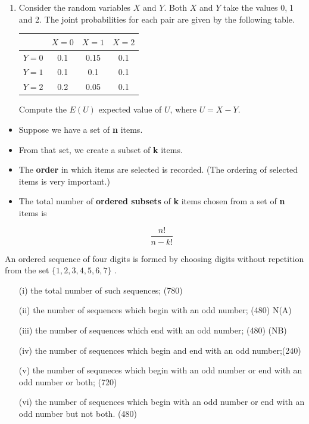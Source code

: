 \documentclass[12pt]{report}
\begin{document}
\begin{enumerate}
	
	\item Consider the random variables $X$ and $Y$. Both $X$ and $Y$ take the values 0,$\;$1 and 2. 
	The joint probabilities for each pair are given by the following table.
	\begin{center}
		\begin{tabular}{|c|c|c|c|}
			\hline  & $X=0$ & $X=1$ & $X=2$ \\ 
			\hline $Y=0$ & 0.1 & 0.15 & 0.1 \\ 
			\hline $Y=1$ & 0.1 & 0.1 & 0.1 \\ 
			\hline $Y=2$ & 0.2 & 0.05 & 0.1 \\ 
			\hline 
		\end{tabular} 
	\end{center}
	Compute the $E(U)$ expected value of $U$, where $U=X-Y$.
\end{enumerate}
\newpage
{\Large
	\begin{itemize}
		
		\item Suppose we have a set of \textbf{n} items.
		\item From that set, we create a subset of \textbf{k} items.
		\item The \textbf{order} in which items are selected is recorded. (The ordering of selected items is very important.) 
		\item The total number of \textbf{ordered subsets} of \textbf{k} items chosen from a set of \textbf{n} items is
		
		\[\frac{n!}{n-k!}\]
	\end{itemize}
}


An ordered sequence of four digits is formed by choosing digits without
repetition from the set $\{1, 2, 3, 4, 5, 6, 7\}$ .

\begin{itemize}
	\item[(i)] the total number of such sequences; (780)
	\item[(ii)] the number of sequences which begin with an odd number; (480) N(A)
	\item[(iii)] the number of sequences which end with an odd number; (480) (NB)
	\item[(iv)] the number of sequences which begin and end with an odd number;(240)
	\item[(v)] the number of sequneces which begin with an odd number or end with an
	odd number or both; (720)
	\item[(vi)] the number of sequences which begin with an odd number or end with an
	odd number but not both. (480)
\end{itemize}
\end{document}
